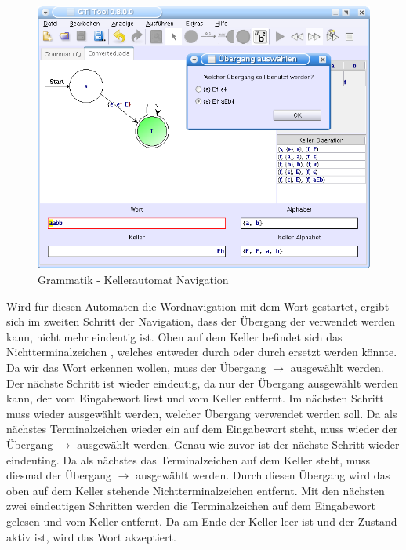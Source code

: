 \begin{figure}[h]
\begin{center}
\includegraphics[width=12cm]{images/grammar_pda.png}
\caption{Grammatik - Kellerautomat Navigation}
\end{center}
\end{figure}

Wird für diesen Automaten die Wordnavigation mit dem Wort  gestartet,
ergibt sich im zweiten Schritt der Navigation, dass der Übergang der verwendet
werden kann, nicht mehr eindeutig ist. Oben auf dem Keller befindet sich das
Nichtterminalzeichen , welches entweder durch
\TerminalSymbol{$\epsilon$} oder durch
 ersetzt werden könnte. Da
wir das Wort  erkennen wollen, muss der Übergang 
$\to$  ausgewählt werden.
Der nächste Schritt ist wieder eindeutig, da nur der Übergang ausgewählt werden
kann, der  vom Eingabewort liest und  vom
Keller entfernt. Im nächsten Schritt muss wieder ausgewählt werden, welcher
Übergang verwendet werden soll. Da als nächstes Terminalzeichen wieder ein
 auf dem Eingabewort steht, muss wieder der Übergang 
$\to$  ausgewählt werden.
Genau wie zuvor ist der nächste Schritt wieder eindeuting. Da als nächstes das
Terminalzeichen  auf dem Keller steht, muss diesmal der
Übergang  $\to$ \TerminalSymbol{$\epsilon$} ausgewählt werden.
Durch diesen Übergang wird das oben auf dem Keller stehende
Nichtterminalzeichen  entfernt. Mit den nächsten zwei
eindeutigen Schritten werden die Terminalzeichen  auf dem
Eingabewort gelesen und vom Keller entfernt. Da am Ende der Keller leer ist und
der Zustand  aktiv ist, wird das Wort akzeptiert.